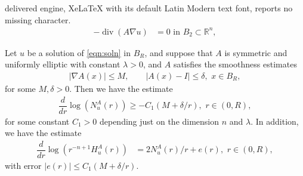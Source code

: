 \documentclass[10pt,a4paper]{amsart}
\DeclareMathOperator{\divv}{\mathrm{div}}
\newcommand{\R}{\mathbb{R}}
\newcommand{\abs}[1]{\left \lvert #1 \right \rvert}
\begin{document}
delivered engine, XeLaTeX with its default Latin Modern text font, reports no missing character.
	\begin{align}
		-\divv(A \nabla u) & = 0  \text{ in } B_2 \subset \R^n, \label{eqn:soln}
	\end{align}

	\begin{lemma}\label{lem:almost_monoton}
		Let $u$ be a solution of \eqref{eqn:soln} in $B_R$, and suppose that $A$ is symmetric and uniformly elliptic with constant $\lambda >0$, and $A$ satisfies the smoothness estimates 
		\begin{align*}
			\abs{\nabla A(x)} \le M, \qquad \abs{A(x) - I } \le \delta, \, \, x \in B_R, 
		\end{align*}
		for some $ M, \delta >0$. Then we have the estimate 
		\begin{align*}
			\dfrac{d}{dr}  \log \left(   N_u^A(r) \right) \ge - C_1 ( M + \delta/r), \, \, r \in (0,R),
		\end{align*}
		for some constant $C_1 >0$ depending just on the dimension $n$ and $\lambda$. In addition, we have the estimate
		\begin{align*}
			\dfrac{d}{dr} \log( r^{-n+1} H_u^A(r)) & =  2 N_u^A(r)/r + e(r), \, \, r \in (0, R),
		\end{align*}
		with error $\abs{e(r)} \le C_1 ( M + \delta/r)$. 
	\end{lemma}
\end{document}
